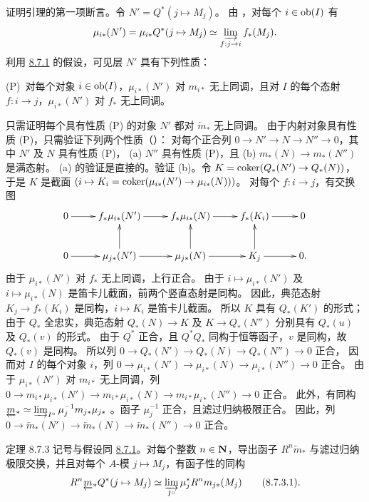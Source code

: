 证明引理的第一项断言。令 $N'=Q^{\ast}(j\mapsto M_j)$。
由 ，对每个 $i\in\operatorname{ob}(I)$ 有
$$
\mu_{i\ast}(N') = \mu_{i\ast} Q^{\ast} (j \mapsto M_j) \simeq
\varinjlim_{f : j \to i} f_{\ast} (M_j){\quoi}.
$$
利用 \hyperref[VI.subsubsec8.7.1]{8.7.1} 的假设，可见层 $N'$ 具有下列性质：

(P)~对每个对象 $i\in\operatorname{ob}(I)$，$\mu_{i\ast}(N')$ 对 $m_{i\ast}$ 无上同调，且对
$I$ 的每个态射 $f:i\to j$，$\mu_{i\ast}(N')$ 对 $f_{\ast}$ 无上同调。

只需证明每个具有性质 (P) 的对象 $N'$ 都对 $\underleftarrow{m}_{\ast}$ 无上同调。
由于内射对象具有性质 (P)，只需验证下列两个性质（）：
对每个正合列 $0\to N'\to N\to N''\to0$，其中 $N'$ 及 $N$ 具有性质 (P)，
(a) $N''$ 具有性质 (P)，且 (b) $m_{\ast}(N)\to m_{\ast}(N'')$ 是满态射。
(a) 的验证是直接的。验证 (b)。令 $K=\coker(Q_{\ast}(N')\to Q_{\ast}(N))$，
于是 $K$ 是截面 $(i\mapsto K_i=\coker(\mu_{i\ast}(N')\to\mu_{i\ast}(N)))$。
对每个 $f:i\to j$，有交换图
\[
\xymatrix{
0  \ar[r] & f_{\ast}\mu_{i\ast}(N') \ar[r] & f_{\ast}\mu_{i\ast}(N)\ar[r]
 & f_{\ast}(K_i) \ar[r]& 0\\
0  \ar[r] & \mu_{j\ast}(N')\ar[u] \ar[r] & \mu_{j\ast}(N) \ar[u] \ar[r] & K_j
\ar[r] \ar[u]&0.
}
\]
由于\pageoriginale{} $\mu_{i\ast}(N')$ 对 $f_{\ast}$ 无上同调，上行正合。
由于 $i\mapsto\mu_{i\ast}(N')$ 及 $i\mapsto\mu_{i\ast}(N)$ 是笛卡儿截面，前两个竖直态射是同构。
因此，典范态射 $K_j\to f_{\ast}(K_i)$ 是同构，$i\mapsto K_i$ 是笛卡儿截面。
所以 $K$ 具有 $Q_{\ast}(K')$ 的形式；由于 $Q_{\ast}$ 全忠实，典范态射
$Q_{\ast}(N)\to K$ 及 $K\to Q_{\ast}(N'')$ 分别具有 $Q_{\ast}(u)$ 及 $Q_{\ast}(v)$ 的形式。
由于 $Q^{\ast}$ 正合，且 $Q^{\ast}Q_{\ast}$ 同构于恒等函子，$v$ 是同构，故 $Q_{\ast}(v)$ 是同构。
所以列 $0\to Q_{\ast}(N')\to Q_{\ast}(N)\to Q_{\ast}(N'')\to0$ 正合，
因而对 $I$ 的每个对象 $i$，列 $0\to\mu_{i\ast}(N')\to\mu_{i\ast}(N)\to\mu_{i\ast}(N'')\to0$ 正合。
由于 $\mu_{i\ast}(N')$ 对 $m_{i\ast}$ 无上同调，列
$0\to m_{i\ast}\mu_{i\ast}(N')\to m_{i\ast}\mu_{i\ast}(N)\to m_{i\ast}\mu_{i\ast}(N'')\to0$ 正合。
此外，有同构
$\underleftarrow{m}_{\ast}\simeq \varinjlim_{I^{\circ}}\mu^{-1}_jm_{j\ast}\mu_{j\ast}$
。函子 $\mu^{-1}_j$ 正合，且滤过归纳极限正合。
因此，列 $0\to\underleftarrow{m}_{\ast}(N')\to\underleftarrow{m}_{\ast}(N)\to\underleftarrow{m}_{\ast}(N'')\to0$ 正合。

\begin{enonce*}{定理 8.7.3}
记号与假设同 \hyperref[VI.subsubsec8.7.1]{8.7.1}。对每个整数 $n\in\mathbf{N}$，导出函子
$R^n\underleftarrow{m}_{\ast}$ 与滤过归纳极限交换，并且对每个 $A$-模
$j\mapsto M_j$，有函子性的同构
\begin{equation*}
R^{n} \underleftarrow{m}_{\ast} Q^{\ast} (j \mapsto M_j) \simeq
\varinjlim_{I^{\circ}}
\mu^{\ast}_j R^n m_{j\ast} (M_j)\tag{8.7.3.1}{}.
\end{equation*}
\end{enonce*}

